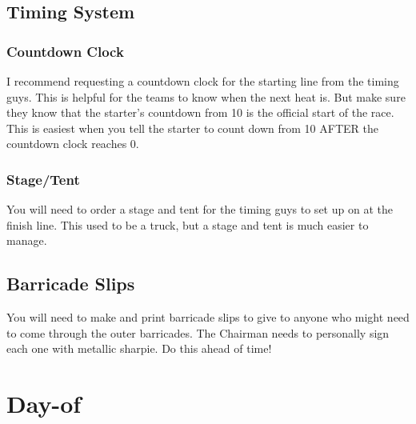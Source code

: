 \subsection{Timing System}
\subsubsection{Countdown Clock}
I recommend requesting a countdown clock for the starting line from the
timing guys. This is helpful for the teams to know when the next heat is.
But make sure they know that the starter's countdown from 10 is the official
start of the race. This is easiest when you tell the starter to count down
from 10 AFTER the countdown clock reaches 0.

\subsubsection{Stage/Tent}
You will need to order a stage and tent for the timing guys to set up on at
the finish line. This used to be a truck, but a stage and tent is much easier
to manage.

\subsection{Barricade Slips}
You will need to make and print barricade slips to give to anyone who might
need to come through the outer barricades. The Chairman needs to personally
sign each one with metallic sharpie. Do this ahead of time!


\section{Day-of}
